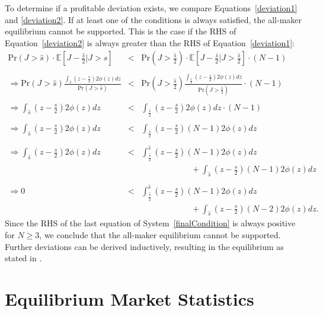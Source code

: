 \documentclass[12pt]{article}
\begin{document}
\begin{appendices}
To determine if a profitable deviation exists, we compare Equations~\eqref{deviation1} and \eqref{deviation2}. If at least one of the conditions is always satisfied, the all-maker equilibrium cannot be supported. This is the case if the RHS of Equation~\eqref{deviation2} is always greater than the RHS of Equation~\eqref{deviation1}:
\begin{equation}
\begin{array}{ccc}
\textrm{Pr}\left(J>\hat{s}\right)\cdot\mathbb{E}\left[J-\frac{\hat{s}}{2}|J>\hat{s}\right]
& < & 
\textrm{Pr}\left(J>\frac{\hat{s}}{2}\right)\cdot\mathbb{E}\left[J-\frac{\hat{s}}{2}|J>\frac{\hat{s}}{2}\right]\cdot(N-1)\\
\\
\Rightarrow \textrm{Pr}(J>\hat{s})\frac{\int_{\hat{s}}(z-\frac{s}{2})2\phi(z)dz}{\textrm{Pr}(J>\hat{s})} 
& < & 
\textrm{Pr}(J>\frac{\hat{s}}{2})\frac{\int_{\frac{\hat{s}}{2}}(z-\frac{s}{2})2\phi(z)dz}{\textrm{Pr}(J>\frac{\hat{s}}{2})}\cdot(N-1)\\
\\
\Rightarrow \int_{\hat{s}}(z-\frac{s}{2})2\phi(z)dz 
& < & 
\int_{\frac{\hat{s}}{2}}(z-\frac{s}{2})2\phi(z)dz\cdot(N-1)\\
\\
\Rightarrow \int_{\hat{s}}(z-\frac{s}{2})2\phi(z)dz 
& < & 
\int_{\frac{\hat{s}}{2}}(z-\frac{s}{2})(N-1)2\phi(z)dz\\
\\
\Rightarrow \int_{\hat{s}}(z-\frac{s}{2})2\phi(z)dz 
& < & 
\int_{\frac{\hat{s}}{2}}^{\hat{s}}(z-\frac{s}{2})(N-1)2\phi(z)dz \\
& & \hspace{1in} +\int_{\hat{s}}(z-\frac{s}{2})(N-1)2\phi(z)dz\\
\\
\Rightarrow 0 
& < & 
\int_{\frac{\hat{s}}{2}}^{\hat{s}}(z-\frac{s}{2})(N-1)2\phi(z)dz \\
& & \hspace{1in} +\int_{\hat{s}}(z-\frac{s}{2})(N-2)2\phi(z)dz. \label{finalCondition}
\end{array}
\end{equation}
Since the RHS of the last equation of System~\eqref{finalCondition} is always positive for $N \geq 3$, we conclude that the all-maker equilibrium cannot be supported. Further deviations can be derived inductively, resulting in the equilibrium as stated in \citet{Budish2015}.

\section{Equilibrium Market Statistics}
\label{marketStats}


\end{appendices}
\end{document}
